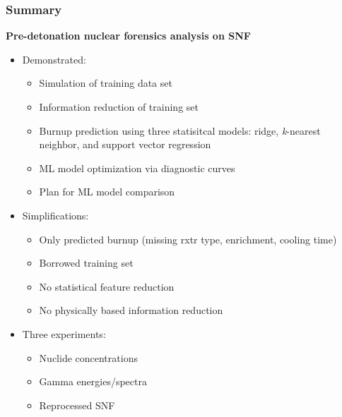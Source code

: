 \begin{frame}
  \frametitle{Summary}
  \textbf{Pre-detonation nuclear forensics analysis on SNF}
  \small
  \begin{itemize}
    \item Demonstrated:
    \begin{itemize}
      \item Simulation of training data set
      \item Information reduction of training set
      \item Burnup prediction using three statisitcal models: ridge, \textit{k}-nearest neighbor, and support vector regression
      \item ML model optimization via diagnostic curves
      \item Plan for ML model comparison
    \end{itemize}
    \item Simplifications:
    \begin{itemize}
      \item Only predicted burnup (missing rxtr type, enrichment, cooling time)
      \item Borrowed training set
      \item No statistical feature reduction
      \item No physically based information reduction
    \end{itemize}
    \item Three experiments:
    \begin{itemize}
      \item Nuclide concentrations
      \item Gamma energies/spectra
      \item Reprocessed SNF
    \end{itemize}
  \end{itemize}
\end{frame}
